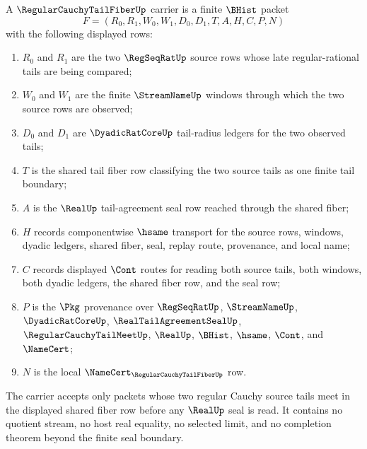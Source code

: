 \begin{definition}
\label{def:regular-cauchy-tail-fiber-carrier}
A $\RegularCauchyTailFiberUp$ carrier is a finite $\BHist$ packet
$$
F=(R_0,R_1,W_0,W_1,D_0,D_1,T,A,H,C,P,N)
$$
with the following displayed rows:
\begin{enumerate}
\item $R_0$ and $R_1$ are the two $\RegSeqRatUp$ source rows whose late regular-rational tails are being compared;
\item $W_0$ and $W_1$ are the finite $\StreamNameUp$ windows through which the two source rows are observed;
\item $D_0$ and $D_1$ are $\DyadicRatCoreUp$ tail-radius ledgers for the two observed tails;
\item $T$ is the shared tail fiber row classifying the two source tails as one finite tail boundary;
\item $A$ is the $\RealUp$ tail-agreement seal row reached through the shared fiber;
\item $H$ records componentwise $\hsame$ transport for the source rows, windows, dyadic ledgers, shared fiber, seal, replay route, provenance, and local name;
\item $C$ records displayed $\Cont$ routes for reading both source tails, both windows, both dyadic ledgers, the shared fiber row, and the seal row;
\item $P$ is the $\Pkg$ provenance over $\RegSeqRatUp$, $\StreamNameUp$, $\DyadicRatCoreUp$, $\RealTailAgreementSealUp$, $\RegularCauchyTailMeetUp$, $\RealUp$, $\BHist$, $\hsame$, $\Cont$, and $\NameCert$;
\item $N$ is the local $\NameCert_{\RegularCauchyTailFiberUp}$ row.
\end{enumerate}
The carrier accepts only packets whose two regular Cauchy source tails meet in the displayed shared fiber row before any $\RealUp$ seal is read. It contains no quotient stream, no host real equality, no selected limit, and no completion theorem beyond the finite seal boundary.
\end{definition}

